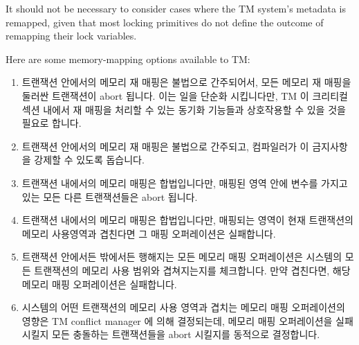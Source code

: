 It should not be necessary to consider cases where the TM system's
metadata is remapped, given that most locking primitives do not define
the outcome of remapping their lock variables.

Here are some memory-mapping options available to TM:
\fi

\begin{enumerate}
\item	트랜잭션 안에서의 메모리 재 매핑은 불법으로 간주되어서, 모든 메모리 재
	매핑을 둘러싼 트랜잭션이 abort 됩니다.
	이는 일을 단순화 시킵니다만, TM 이 크리티컬 섹션 내에서 재 매핑을
	처리할 수 있는 동기화 기능들과 상호작용할 수 있을 것을 필요로 합니다.
\item	트랜잭션 안에서의 메모리 재 매핑은 불법으로 간주되고, 컴파일러가 이
	금지사항을 강제할 수 있도록 돕습니다.
\item	트랜잭션 내에서의 메모리 매핑은 합법입니다만, 매핑된 영역 안에 변수를
	가지고 있는 모든 다른 트랜잭션들은 abort 됩니다.
\item	트랜잭션 내에서의 메모리 매핑은 합법입니다만, 매핑되는 영역이 현재
	트랜잭션의 메모리 사용영역과 겹친다면 그 매핑 오퍼레이션은 실패합니다.
\item	트랜잭션 안에서든 밖에서든 행해지는 모든 메모리 매핑 오퍼레이션은
	시스템의 모든 트랜잭션의 메모리 사용 범위와 겹쳐지는지를 체크합니다.
	만약 겹친다면, 해당 메모리 매핑 오퍼레이션은 실패합니다.
\item	시스템의 어떤 트랜잭션의 메모리 사용 영역과 겹치는 메모리 매핑
	오퍼레이션의 영향은 TM conflict manager 에 의해 결정되는데, 메모리 매핑
	오퍼레이션을 실패시킬지 모든 충돌하는 트랜잭션들을 abort 시킬지를
	동적으로 결정합니다.

\end{enumerate}

